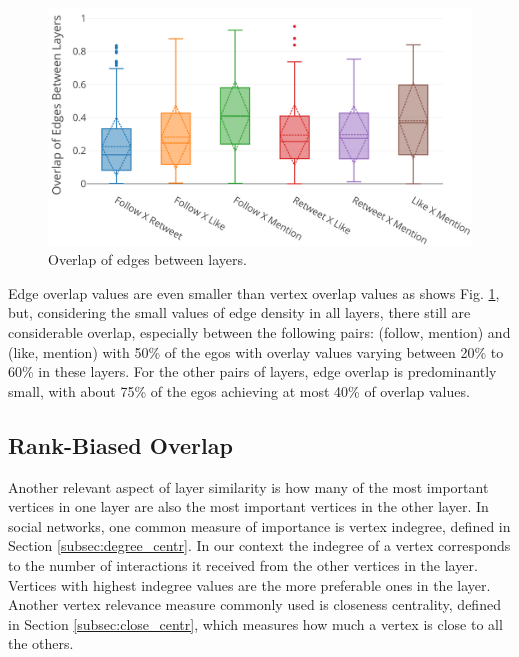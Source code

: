 \begin{figure}[h!tb]
    \centering
    \includegraphics[width=1\textwidth]{fig/net_struct/overlap/overlap_edges_boxplot.png}
    \caption{Overlap of edges between layers.}
    \label{fig:net_struct_overlap_edges_boxplot}
\end{figure}

Edge overlap values are even smaller than vertex overlap values as shows Fig. \ref{fig:net_struct_overlap_edges_boxplot}, but, considering the small values of edge density in all layers, there still are considerable overlap, especially between the following pairs: (follow, mention) and (like, mention) with 50\% of the egos with overlay values varying between 20\% to 60\% in these layers. For the other pairs of layers, edge overlap is predominantly small, with about 75\% of the egos achieving at most 40\% of overlap values.


\subsection*{Rank-Biased Overlap}
\label{subsec:rbo}
Another relevant aspect of layer similarity is how many of the most important vertices in one layer are also the most important vertices in the other layer. In social networks, one common measure of importance is vertex indegree, defined in Section \ref{subsec:degree_centr}. In our context the indegree of a vertex corresponds to the number of interactions it received from the other vertices in the layer. Vertices with highest indegree values are the more preferable ones in the layer. Another vertex relevance measure commonly used is closeness centrality, defined in Section \ref{subsec:close_centr}, which measures how much a vertex is close to all the others.

